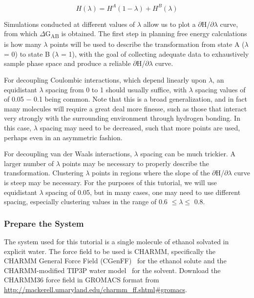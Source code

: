 \documentclass[9pt,tutorial,pubversion]{livecoms}
\begin{document}
\begin{equation} \label{eqn_hamiltonian_AB}
	H(\lambda) = H^{A}(1 - \lambda) + H^{B}(\lambda)
\end{equation}

Simulations conducted at different values of $\lambda$ allow us to plot a $\partial$H/$\partial\lambda$ curve, from which $\Delta$G\textsubscript{AB} is obtained. The first step in planning free energy calculations is how many $\lambda$ points will be used to describe the transformation from state A ($\lambda$ = 0) to state B ($\lambda$ = 1), with the goal of collecting adequate data to exhaustively sample phase space and produce a reliable $\partial$H/$\partial\lambda$ curve.

For decoupling Coulombic interactions, which depend linearly upon $\lambda$, an equidistant $\lambda$ spacing from 0 to 1 should usually suffice, with $\lambda$ spacing values of of 0.05 $-$ 0.1 being common. Note that this is a broad generalization, and in fact many molecules will require a great deal more finesse, such as those that interact very strongly with the surrounding environment through hydrogen bonding. In this case, $\lambda$ spacing may need to be decreased, such that more points are used, perhaps even in an asymmetric fashion.

For decoupling van der Waals interactions, $\lambda$ spacing can be much trickier. A larger number of $\lambda$ points may be necessary to properly describe the transformation. Clustering $\lambda$ points in regions where the slope of the $\partial$H/$\partial\lambda$ curve is steep may be necessary. For the purposes of this tutorial, we will use equidistant $\lambda$ spacing of 0.05, but in many cases, one may need to use different spacing, especially clustering values in the range of 0.6 $\le \lambda \le$ 0.8.

\subsubsection{Prepare the System} \label{dgsolv_prep}

The system used for this tutorial is a single molecule of ethanol solvated in explicit water. The force field to be used is CHARMM, specifically the CHARMM General Force Field (CGenFF)~\cite{Vanommeslaeghe2010} for the ethanol solute and the CHARMM-modified TIP3P water model~\cite{Jorgensen1983,Durell1994,Neria1996} for the solvent. Download the CHARMM36 force field in GROMACS format from \url{http://mackerell.umaryland.edu/charmm_ff.shtml#gromacs}.
\end{document}
